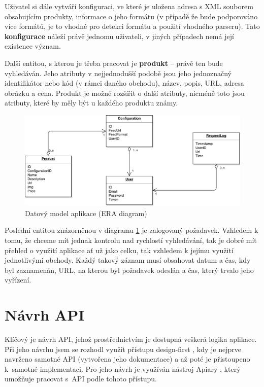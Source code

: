 \documentclass[FM,DP]{tulthesis}
\begin{document}
Uživatel si dále vytváří konfiguraci, ve které je uložena adresa s XML souborem 
obsahujícím produkty, informace o jeho formátu (v případě že bude podporováno více
formátů, je to vhodné pro detekci formátu a použití vhodného parseru). Tato 
\textbf{konfigurace} náleží právě jednomu uživateli, v jiných případech nemá 
její existence význam.

Další entitou, s kterou je třeba pracovat je \textbf{produkt} -- právě ten bude vyhledáván.
Jeho atributy v nejjednodušší podobě jsou jeho jednoznačný identifikátor nebo kód
(v rámci daného obchodu), název, popis, URL, adresa obrázku a cena. Produkt je možné
rozšířit o další atributy, nicméně toto jsou atributy, které by měly být u každého
produktu známy.

\begin{figure}[h]
\center
\includegraphics[width=\textwidth]{era-diagram.pdf}
\caption[Datový model aplikace]{Datový model aplikace (ERA diagram)}
\label{datovy-model}
\end{figure}

Poslední entitou znázorněnou v diagramu \ref{datovy-model} je zalogovaný požadavek. 
Vzhledem k tomu, že chceme mít jednak kontrolu nad rychlostí vyhledávání, tak je dobré mít
přehled o využití aplikace ať už jako celku, tak vzhledem k jejímu využití jednotlivými
obchody. Každý takový záznam musí obsahovat datum a čas, kdy byl zaznamenán, 
URL, na kterou byl požadavek odeslán a čas, který trvalo jeho vyřízení.

\section{Návrh API}

Klíčový je návrh API, jehož prostřednictvím je dostupná veškerá logika aplikace. 
Při jeho návrhu jsem se rozhodl využít přístupu design-first \cite{apiary-design}, 
kdy je nejprve navrženo samotné API (vytvořena jeho dokumentace) a až poté je přistoupeno 
k~samotné implementaci. Pro jeho návrh je využíván nástroj Apiary \cite{apiary}, který 
umožňuje pracovat s~API podle tohoto přístupu.
\end{document}
